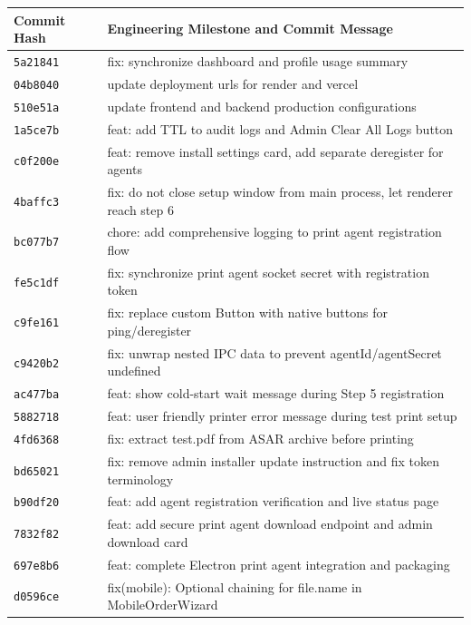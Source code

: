 \documentclass[12pt,a4paper,oneside]{report}
\begin{document}
\begin{table}[H]
\centering
\small
\begin{tabularx}{\textwidth}{|p{0.75in}|X|}
\hline
\textbf{Commit Hash} & \textbf{Engineering Milestone and Commit Message} \\ \hline
\texttt{5a21841} & fix: synchronize dashboard and profile usage summary \\ \hline
\texttt{04b8040} & update deployment urls for render and vercel \\ \hline
\texttt{510e51a} & update frontend and backend production configurations \\ \hline
\texttt{1a5ce7b} & feat: add TTL to audit logs and Admin Clear All Logs button \\ \hline
\texttt{c0f200e} & feat: remove install settings card, add separate deregister for agents \\ \hline
\texttt{4baffc3} & fix: do not close setup window from main process, let renderer reach step 6 \\ \hline
\texttt{bc077b7} & chore: add comprehensive logging to print agent registration flow \\ \hline
\texttt{fe5c1df} & fix: synchronize print agent socket secret with registration token \\ \hline
\texttt{c9fe161} & fix: replace custom Button with native buttons for ping/deregister \\ \hline
\texttt{c9420b2} & fix: unwrap nested IPC data to prevent agentId/agentSecret undefined \\ \hline
\texttt{ac477ba} & feat: show cold-start wait message during Step 5 registration \\ \hline
\texttt{5882718} & feat: user friendly printer error message during test print setup \\ \hline
\texttt{4fd6368} & fix: extract test.pdf from ASAR archive before printing \\ \hline
\texttt{bd65021} & fix: remove admin installer update instruction and fix token terminology \\ \hline
\texttt{b90df20} & feat: add agent registration verification and live status page \\ \hline
\texttt{7832f82} & feat: add secure print agent download endpoint and admin download card \\ \hline
\texttt{697e8b6} & feat: complete Electron print agent integration and packaging \\ \hline
\texttt{d0596ce} & fix(mobile): Optional chaining for file.name in MobileOrderWizard \\ \hline

\end{tabularx}
\end{table}
\end{document}
